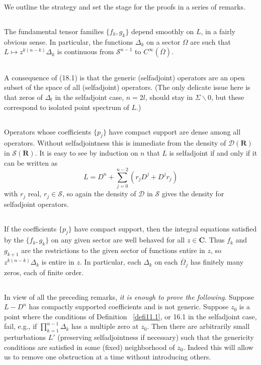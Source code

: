 \documentclass{surv-l}
\theoremstyle{plain}
\theoremstyle{definition}
\numberwithin{equation}{chapter}
\begin{document}
We outline the strategy and set the stage for the proofs in a series of remarks.

\subsection{}\label{subsec18.1}  The fundamental tensor families $\{f_{k}, g_{k}\}$ depend smoothly on $L$, in a fairly obvious sense. In particular, the functions $\Delta_{k}$ on a sector $\Omega$ are such that $L\mapsto z^{k(n-k)}\Delta_{k}$ is continuous from $\mathscr{S}^{n-1}$ to $C^{\infty}(\overline{\Omega})$.
\subsection{}\label{subsec18.2}  A consequence of (18.1) is that the generic (selfadjoint) operators are an open subset of the space of all (selfadjoint) operators. (The only delicate issue here is that zeros of $\Delta_{l}$ in the selfadjoint case, $n=2l$, should stay in $\Sigma\backslash 0$, but these correspond to isolated point spectrum of $L$.)
\subsection{}\label{subsec18.3} Operators whose coefficients  $\{p_{j}\}$  have compact support are dense among all operators. Without selfadjointness this is immediate from the density of $\mathscr{D}\mathbf{(R)}$ in $\mathscr{S}\mathbf{(R)}$. It is easy to see by induction on $n$ that $L$ is selfadjoint if and only if it can be written as
\begin{equation*}
L=D^{n}+\sum_{j=0}^{n-2}(r_{j}D^{j}+D^{j}r_{j})
\end{equation*}
with $r_{j}$ real, $r_{j}\in \mathscr{S}$, so again the density of $\mathscr{D}$ in $\mathscr{S}$ gives the density for selfadjoint operators.
\subsection{}\label{subsec18.4}  If the coefficients $\{p_{j}\}$ have compact support, then the integral equations satisfied by the $\{f_{k},g_{k}\}$ on any given sector are well behaved for all $ z\in \mathbf{C}$. Thus $f_{k}$ and $g_{k+1}$ are the restrictions to the given sector of functions entire in $z$, so $z^{k(n-k)}\Delta_{k}$ is entire in $z$. In particular, each $\Delta_{k}$ on each $\overline{\Omega}_{j}$ has finitely many zeros, each of finite order.
\subsection{}\label{subsec18.5}  In view of all the preceding remarks, \emph{it is enough to prove the following}. Suppose $L-D^{n}$ has compactly supported coefficients and is not generic. Suppose $z_{0}$ is a point where the conditions of Definition ~\ref{defi11.1}, or 16.1 in the selfadjoint case, fail, e.g., if $\prod_{k=1}^{n-1}\Delta_{k}$ has a multiple zero at $z_{0}$. Then there are arbitrarily small perturbations $L'$ (preserving selfadjointness if necessary) such that the genericity conditions are satisfied in some (fixed) neighborhood of $z_{0}$. Indeed this will allow us to remove one obstruction at a time without introducing others.
\end{document}
